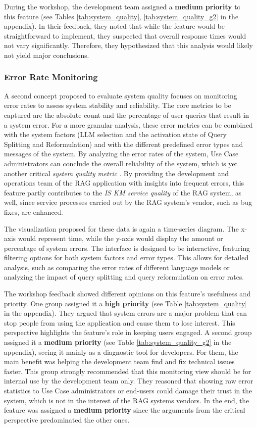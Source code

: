\documentclass[
	english,
	ruledheaders=section,%
	class=report,%
	thesis={type=bachelor},%
	accentcolor=1b,%
	custommargins=true,%
	marginpar=false,%
	parskip=half-,%
	fontsize=11pt,%
	DIV=14,
]{tudapub}
\begin{document}
During the workshop, the development team assigned a \textbf{medium priority} to this feature (see Tables \ref{tab:system_quality}, \ref{tab:system_quality_g2} in the appendix). In their feedback, they noted that while the feature would be straightforward to implement, they suspected that overall response times would not vary significantly. Therefore, they hypothesized that this analysis would likely not yield major conclusions.

\subsubsection{Error Rate Monitoring}
A second concept proposed to evaluate system quality focuses on monitoring error rates to assess system stability and reliability. The core metrics to be captured are the absolute count and the percentage of user queries that result in a system error. For a more granular analysis, these error metrics can be combined with the system factors (LLM selection and the activation state of Query Splitting and Reformulation) and with the different predefined error types and messages of the system. By analyzing the error rates of the system, Use Case administrators can conclude the overall reliability of the system, which is yet another critical \textit{system quality metric} \parencite[p.~64]{DeloneMcLean1992ISSuccess}. By providing the development and operations team of the RAG application with insights into frequent errors, this feature partly contributes to the \textit{IS KM service quality} \parencite[pp.~58--59]{Jennex2006} of the RAG system, as well, since service processes carried out by the RAG system's vendor, such as bug fixes, are enhanced.

The visualization proposed for these data is again a time-series diagram. The x-axis would represent time, while the y-axis would display the amount or percentage of system errors. The interface is designed to be interactive, featuring filtering options for both system factors and error types. This allows for detailed analysis, such as comparing the error rates of different language models or analyzing the impact of query splitting and query reformulation on error rates.

The workshop feedback showed different opinions on this feature's usefulness and priority. One group assigned it a \textbf{high priority} (see Table \ref{tab:system_quality} in the appendix). They argued that system errors are a major problem that can stop people from using the application and cause them to lose interest. This perspective highlights the feature's role in keeping users engaged. A second group assigned it a \textbf{medium priority} (see Table \ref{tab:system_quality_g2} in the appendix), seeing it mainly as a diagnostic tool for developers. For them, the main benefit was helping the development team find and fix technical issues faster. This group strongly recommended that this monitoring view should be for internal use by the development team only. They reasoned that showing raw error statistics to Use Case administrators or end-users could damage their trust in the system, which is not in the interest of the RAG systems vendors. In the end, the feature was assigned a \textbf{medium priority} since the arguments from the critical perspective predominated the other ones.
\end{document}
